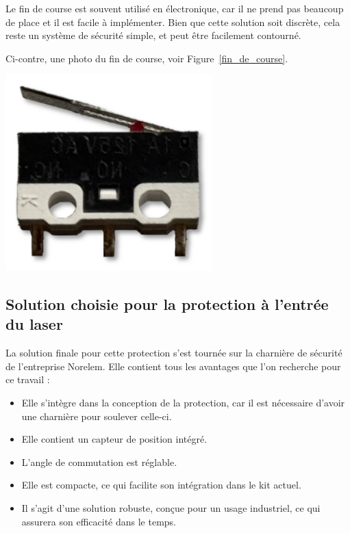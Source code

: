 \begin{minipage}[c]{0.6\textwidth}
    Le fin de course est souvent utilisé en électronique, car il ne prend pas beaucoup de place et il est facile à implémenter. Bien que cette solution soit discrète, cela reste un système de sécurité simple, et peut être facilement contourné.

    Ci-contre, une photo du fin de course, voir Figure~\ref{fin_de_course}.
\end{minipage}\hfill
\begin{minipage}[c]{0.35\textwidth}
    \begin{center}
        \includegraphics[width=0.6\textwidth]{assets/figures/Protections_laser/Securite_electrique/fin_de_course.png}
    \end{center}
    \label{fin_de_course}
\end{minipage}

\newpage
\subsection{Solution choisie pour la protection à l'entrée du laser}
La solution finale pour cette protection s'est tournée sur la charnière de sécurité de l'entreprise Norelem. Elle contient tous les avantages que l'on recherche pour ce travail :
\begin{itemize}
    \item Elle s'intègre dans la conception de la protection, car il est nécessaire d'avoir une charnière pour soulever celle-ci.
    \item Elle contient un capteur de position intégré.
    \item L'angle de commutation est réglable.
    \item Elle est compacte, ce qui facilite son intégration dans le kit actuel.
    \item Il s'agit d'une solution robuste, conçue pour un usage industriel, ce qui assurera son efficacité dans le temps.
\end{itemize}

